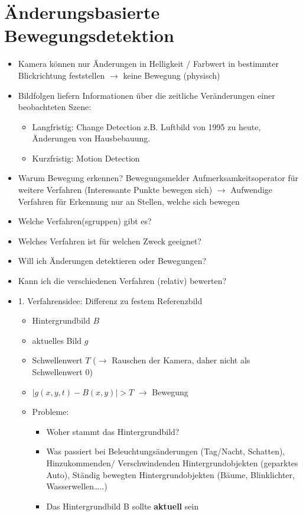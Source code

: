 \documentclass{report}
\begin{document}
	\section{Änderungsbasierte Bewegungsdetektion}
	
	\begin{itemize}
		\item Kamera können nur Änderungen in Helligkeit / Farbwert in bestimmter Blickrichtung feststellen $\rightarrow$ keine Bewegung (physisch)
		\item Bildfolgen liefern Informationen über die zeitliche Veränderungen einer beobachteten Szene:
		\begin{itemize}
			\item Langfristig: Change Detection
			\newline z.B. Luftbild von 1995 zu heute, Änderungen von Hausbebauung.
			\item Kurzfristig: Motion Detection
		\end{itemize}
		
		\item Warum Bewegung erkennen?
		\newline Bewegungsmelder
		\newline Aufmerksamkeitsoperator für weitere Verfahren (Interessante Punkte bewegen sich)
		\newline $\rightarrow$ Aufwendige Verfahren für Erkennung nur an Stellen, welche sich bewegen
		
		\item Welche Verfahren(sgruppen) gibt es?
		\item Welches Verfahren ist für welchen Zweck geeignet?
		\item Will ich Änderungen detektieren oder Bewegungen?
		\item Kann ich die verschiedenen Verfahren (relativ) bewerten?
		
		\item 1. Verfahrensidee: Differenz zu festem Referenzbild
		\begin{itemize}
			\item Hintergrundbild $B$
			\item aktuelles Bild $g$
			\item Schwellenwert $T$ ($\rightarrow$ Rauschen der Kamera, daher nicht als Schwellenwert 0)
			\item $|g(x,y,t) - B(x,y)| > T$ $\rightarrow$ Bewegung
			\item Probleme:
			\begin{itemize}
				\item Woher stammt das Hintergrundbild?
				\item Was passiert bei
				\newline Beleuchtungsänderungen (Tag/Nacht, Schatten),
				\newline Hinzukommenden/ Verschwindenden Hintergrundobjekten (geparktes Auto),
				\newline Ständig bewegten Hintergrundobjekten (Bäume, Blinklichter, Wasserwellen…..)
				\item Das Hintergrundbild B sollte \textbf{aktuell} sein
			\end{itemize}
			

\end{itemize}
\end{itemize}
\end{document}

